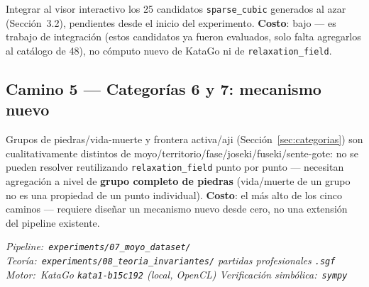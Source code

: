 \documentclass[11pt, a4paper]{article}
\begin{document}
Integrar al visor interactivo los 25 candidatos \texttt{sparse\_cubic}
generados al azar (Secci\'on~3.2), pendientes desde el inicio del
experimento. \textbf{Costo}: bajo --- es trabajo de integraci\'on
(estos candidatos ya fueron evaluados, solo falta agregarlos al
cat\'alogo de 48), no c\'omputo nuevo de KataGo ni de
\texttt{relaxation\_field}.

\subsection{Camino 5 --- Categor\'ias 6 y 7: mecanismo nuevo}

Grupos de piedras/vida-muerte y frontera activa/aji
(Secci\'on~\ref{sec:categorias}) son cualitativamente distintos de
moyo/territorio/fase/joseki/fuseki/sente-gote: no se pueden resolver
reutilizando \texttt{relaxation\_field} punto por punto --- necesitan
agregaci\'on a nivel de \textbf{grupo completo de piedras} (vida/muerte
de un grupo no es una propiedad de un punto individual). \textbf{Costo}:
el m\'as alto de los cinco caminos --- requiere dise\~nar un mecanismo
nuevo desde cero, no una extensi\'on del pipeline existente.

\vfill
{}\vspace{4pt}
{\color{cMuted}\small\itshape
  Pipeline:~\texttt{experiments/07\_moyo\_dataset/}
  \quad\textbullet\quad
  Teor\'ia:~\texttt{experiments/08\_teoria\_invariantes/}
  \quad\textbullet{} partidas profesionales \texttt{.sgf}
  \quad\textbullet\quad
  Motor:~KataGo \texttt{kata1-b15c192} (local, OpenCL)
  \quad\textbullet\quad
  Verificaci\'on simb\'olica:~\texttt{sympy}
}
\end{document}
